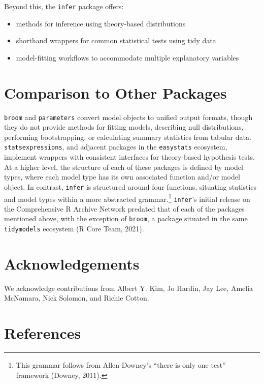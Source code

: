 \documentclass[10pt,a4paper,onecolumn]{article}
\providecommand{\tightlist}{%
  \setlength{\itemsep}{0pt}\setlength{\parskip}{0pt}}
\begin{document}
Beyond this, the \texttt{infer} package offers:

\begin{itemize}
\tightlist
\item
  methods for inference using theory-based distributions
\item
  shorthand wrappers for common statistical tests using tidy data
\item
  model-fitting workflows to accommodate multiple explanatory variables
\end{itemize}

\hypertarget{comparison-to-other-packages}{%
\section{Comparison to Other
Packages}\label{comparison-to-other-packages}}

\texttt{broom} and \texttt{parameters} convert model objects to unified
output formats, though they do not provide methods for fitting models,
describing null distributions, performing bootstrapping, or calculating
summary statistics from tabular data. \texttt{statsexpressions}, and
adjacent packages in the \texttt{easystats} ecosystem, implement
wrappers with consistent interfaces for theory-based hypothesis tests.
At a higher level, the structure of each of these packages is defined by
model types, where each model type has its own associated function
and/or model object. In contrast, \texttt{infer} is structured around
four functions, situating statistics and model types within a more
abstracted grammar.\footnote{This grammar follows from Allen Downey's
  ``there is only one test'' framework (Downey, 2011).} \texttt{infer}'s
initial release on the Comprehensive R Archive Network predated that of
each of the packages mentioned above, with the exception of
\texttt{broom}, a package situated in the same \texttt{tidymodels}
ecosystem (R Core Team, 2021).

\hypertarget{acknowledgements}{%
\section{Acknowledgements}\label{acknowledgements}}

We acknowledge contributions from Albert Y. Kim, Jo Hardin, Jay Lee,
Amelia McNamara, Nick Solomon, and Richie Cotton.

\hypertarget{references}{%
\section*{References}\label{references}}
\end{document}
